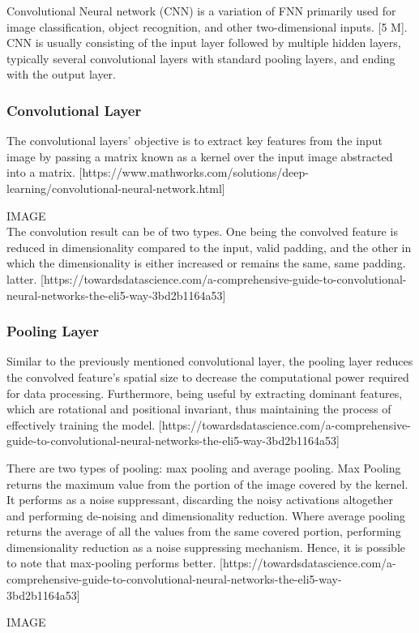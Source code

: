 
Convolutional Neural network (CNN) is a variation of FNN primarily used for image classification, object recognition, and other two-dimensional inputs. [5 M]. CNN is usually consisting of the input layer followed by multiple hidden layers, typically several convolutional layers with standard pooling layers, and ending with the output layer.

\subsubsection{Convolutional Layer}

The convolutional layers' objective is to extract key features from the input image by passing a matrix known as a kernel over the input image abstracted into a matrix.  [https://www.mathworks.com/solutions/deep-learning/convolutional-neural-network.html]\newline

IMAGE \\

The convolution result can be of two types. One being the convolved feature is reduced in dimensionality compared to the input, valid padding, and the other in which the dimensionality is either increased or remains the same, same padding. latter. [https://towardsdatascience.com/a-comprehensive-guide-to-convolutional-neural-networks-the-eli5-way-3bd2b1164a53]

\subsubsection{Pooling Layer}


Similar to the previously mentioned convolutional layer, the pooling layer reduces the convolved feature's spatial size to decrease the computational power required for data processing.
Furthermore, being useful by extracting dominant features, which are rotational and positional invariant, thus maintaining the process of effectively training the model. [https://towardsdatascience.com/a-comprehensive-guide-to-convolutional-neural-networks-the-eli5-way-3bd2b1164a53]

There are two types of pooling: max pooling and average pooling. Max Pooling returns the maximum value from the portion of the image covered by the kernel. It performs as a noise suppressant, discarding the noisy activations altogether and performing de-noising and dimensionality reduction. Where average pooling returns the average of all the values from the same covered portion, performing dimensionality reduction as a noise suppressing mechanism. Hence, it is possible to note that max-pooling performs better. [https://towardsdatascience.com/a-comprehensive-guide-to-convolutional-neural-networks-the-eli5-way-3bd2b1164a53] \newline

IMAGE